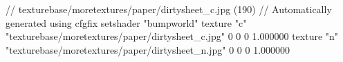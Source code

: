 // texturebase/moretextures/paper/dirtysheet_c.jpg (190)
// Automatically generated using cfgfix
setshader "bumpworld"
texture "c" "texturebase/moretextures/paper/dirtysheet_c.jpg" 0 0 0 1.000000
texture "n" "texturebase/moretextures/paper/dirtysheet_n.jpg" 0 0 0 1.000000
